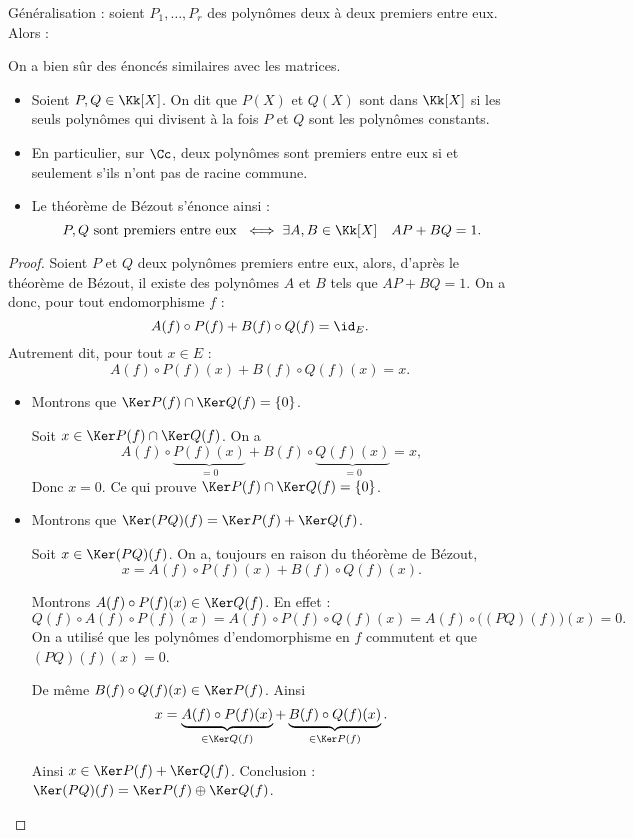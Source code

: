 \documentclass[12pt, class=report,crop=false]{standalone}
\begin{document}
Généralisation : soient $P_1,\ldots,P_r$ des polynômes deux à deux premiers entre eux. Alors :

On a bien sûr des énoncés similaires avec les matrices.

\bigskip



\begin{itemize}
  \item Soient $P,Q \in \Kk[X]$. On dit que $P(X)$ et $Q(X)$ sont  dans $\Kk[X]$ si les seuls polynômes qui divisent à la fois $P$ et $Q$ sont les polynômes constants.

  \item En particulier, sur $\Cc$, deux polynômes sont premiers entre eux si et seulement s'ils n'ont pas de racine commune.

  \item Le théorème de Bézout s'énonce ainsi :
\[P,Q \text{ sont premiers entre eux } \iff  \exists A,B \in \Kk[X] \quad AP + BQ = 1 .\]
\end{itemize}

\bigskip

\begin{proof}
Soient $P$ et $Q$ deux polynômes premiers entre eux, alors, d'après le théorème de Bézout, il existe des polynômes $A$ et $B$ tels que $AP+BQ=1$. On a donc, pour tout endomorphisme $f$ : 
$$A(f)\circ P(f)+B(f)\circ Q(f) = \id_E.$$
Autrement dit, pour tout $x\in E$ :
$$A(f)\circ P(f)(x)+B(f)\circ Q(f)(x)=x.$$


\begin{itemize}
  \item Montrons que $\Ker P(f) \cap \Ker Q(f) = \{0\}$.
  
Soit $x\in\Ker P(f)\cap\Ker Q(f)$. On a 
$$A(f)\circ \underbrace{P(f)(x)}_{=0}+B(f)\circ\underbrace{Q(f)(x)}_{=0}=x,$$
Donc $x=0$. Ce qui prouve $\Ker P(f)\cap\Ker Q(f)=\{0\}$.


  \item Montrons que $\Ker(PQ)(f) = \Ker P(f) + \Ker Q(f)$.

Soit $x\in\Ker(PQ)(f)$. 
On a, toujours en raison du théorème de Bézout, 
$$x  = A(f)\circ P(f)(x)+B(f)\circ Q(f)(x).$$

Montrons $A(f)\circ P(f)(x) \in \Ker Q(f)$. En effet :
\[Q(f) \circ A(f) \circ P(f)(x) 
= A(f) \circ  P(f) \circ Q(f) (x) 
= A(f) \circ \big((PQ)(f)\big) (x)
= 0.\]
On a utilisé que les polynômes d'endomorphisme en $f$ commutent et
que $(PQ)(f) (x) = 0$.

De même $B(f)\circ Q(f)(x) \in \Ker P(f)$.
Ainsi 
$$x = \underbrace{A(f)\circ P(f)(x)}_{\in\Ker Q(f)}+\underbrace{B(f)\circ Q(f)(x)}_{\in\Ker P(f)}.$$

Ainsi $x \in \Ker P(f) + \Ker Q(f)$. Conclusion : $\Ker(PQ)(f) = \Ker P(f) \oplus \Ker Q(f)$.
\end{itemize}
\end{proof}
\end{document}
